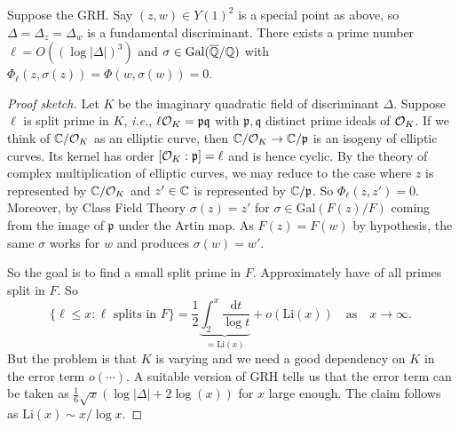 \begin{lemma}
  Suppose the GRH.
  Say $(z,w)\in Y(1)^2$ is a special point as above, so %
 $\Delta=\Delta_z=\Delta_w$ is a fundamental discriminant.
  There exists a prime number $\ell=O((\log
  |\Delta|)^3)$ and $\sigma\in \mathrm{Gal}({\overline{\mathbb{Q}}}/{\mathbb{Q}})$  with $\Phi_\ell(z,\sigma(z))=\Phi(w,\sigma(w))=0$. 
\end{lemma}
\begin{proof}[Proof sketch]
  Let $K$ be the imaginary quadratic field of discriminant $\Delta$.
  Suppose $\ell$ is split prime in $K$, \textit{i.e.}, $\ell{\mathcal O}_K =
  \mathfrak{p}\mathfrak{q}$ with $  \mathfrak{p},\mathfrak{q}$
  distinct prime ideals of ${\mathcal O}_K$.
  If we think of ${\mathbb{C}}/{\mathcal O}_K$ as an elliptic curve,
  then ${\mathbb{C}}/{\mathcal O}_K \rightarrow {\mathbb{C}}/\mathfrak{p}$ is an isogeny of
  elliptic curves. Its kernel has order $[{\mathcal O}_K:\mathfrak{p}]=\ell$
  and is hence cyclic. By the theory of complex multiplication of
  elliptic curves, we may reduce to the case where $z$ is
  represented by ${\mathbb{C}}/{\mathcal O}_K$ and $z'\in {\mathbb{C}}$ is represented by
  ${\mathbb{C}}/\mathfrak{p}$. So $\Phi_{\ell}(z,z')=0$. 
  Moreover, by Class Field Theory $\sigma(z)=z'$ for $\sigma \in
  \mathrm{Gal}(F(z)/F)$ coming from the image of $\mathfrak{p}$ under
  the Artin map. As $F(z)=F(w)$ by hypothesis, the same $\sigma$ works
  for $w$ and produces $\sigma(w)=w'$.

  So the goal is to find a small split prime in $F$. Approximately
  have of all primes split in $F$. So
  \begin{equation*}
    \{\ell \le x : \ell \text{ splits in }F\} = \frac 12 \underbrace{\int_2^x
      \frac{\mathrm{d} t}{\log t}}_{=\mathrm{Li}(x)} + o(\mathrm{Li}(x))
    \quad\text{as}\quad x\rightarrow\infty. 
  \end{equation*}
  But the problem is that $K$ is
  varying and we need a good dependency on $K$ in the error term
  $o(\cdots)$.
  A suitable version of GRH tells us that the error term can be taken
  as
  $\frac 16 \sqrt x (\log|\Delta| + 2\log(x))$ for $x$ large enough.
  The claim follows as $\mathrm{Li}(x)\sim x/\log x$. 
\end{proof}

